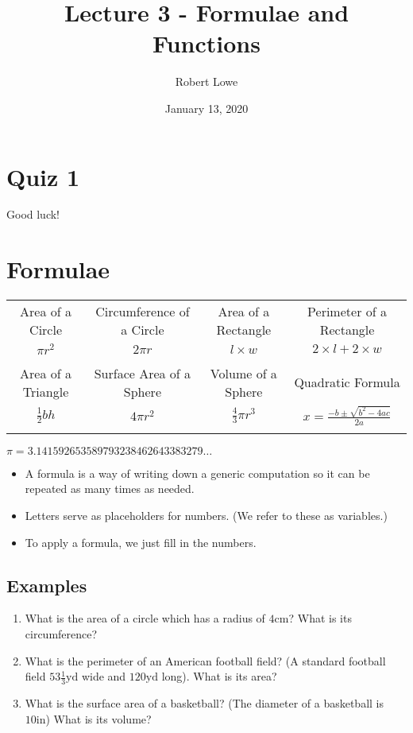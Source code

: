 \documentclass{article}
\title{Lecture 3 - Formulae and Functions}
\author{Robert Lowe}
\date{January 13, 2020}
\begin{document}
\maketitle

\section*{Quiz 1}
Good luck!

\section*{Formulae}
\begin{tabular}{|c|c|c|c|}
\hline
Area of a Circle & Circumference of a Circle & Area of a Rectangle & Perimeter of a Rectangle\\
$\pi r^2$ & $2\pi r$ & $l \times w$ & $2\times l + 2 \times w$\\
& & &\\
\hline
Area of a Triangle & Surface Area of a Sphere & Volume of a Sphere & Quadratic Formula\\
$\frac{1}{2}bh$ & $4 \pi r^2$ & $\frac{4}{3} \pi r ^3$ & $x = \displaystyle\frac{-b \pm \sqrt{b^2-4ac}}{2a}$\\
& & &\\
\hline
\end{tabular}\newline
$\pi=3.141592653589793238462643383279\ldots$

\begin{itemize}
\item A formula is a way of writing down a generic computation so it can be repeated 
 as many times as needed.
\item Letters serve as placeholders for numbers.  (We refer to these as variables.)
\item To apply a formula, we just fill in the numbers.
\end{itemize}

\subsection*{Examples}
\begin{enumerate}
\item What is the area of a circle which has a radius of $4\mathrm{cm}$? What is its circumference?
\item What is the perimeter of an American football field?  (A standard football field $53\frac{1}{3}\mathrm{yd}$ wide and $120 \mathrm{yd}$ long).  What is its area?
\item What is the surface area of a basketball? (The diameter of a basketball is $10\mathrm{in}$) What is its volume?
\end{enumerate}
\end{document}
